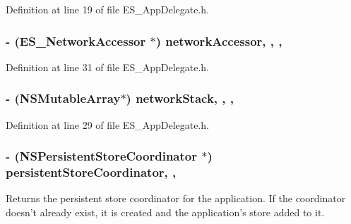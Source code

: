 Definition at line 19 of file E\+S\+\_\+\+App\+Delegate.\+h.

\hypertarget{interface_e_s___app_delegate_a94ebf7775cdbcfc9487f6a0b7b52a703}{
\subsubsection[{network\+Accessor}]{\setlength{\rightskip}{0pt plus 5cm}-\/ ({\bf E\+S\+\_\+\+Network\+Accessor} $\ast$) network\+Accessor\hspace{0.3cm}{\ttfamily [read]}, {\ttfamily [write]}, {\ttfamily [nonatomic]}, {\ttfamily [strong]}}}\label{interface_e_s___app_delegate_a94ebf7775cdbcfc9487f6a0b7b52a703}


Definition at line 31 of file E\+S\+\_\+\+App\+Delegate.\+h.

\hypertarget{interface_e_s___app_delegate_a33cbe1cc0439892b89b132bffac51092}{
\subsubsection[{network\+Stack}]{\setlength{\rightskip}{0pt plus 5cm}-\/ (N\+S\+Mutable\+Array$\ast$) network\+Stack\hspace{0.3cm}{\ttfamily [read]}, {\ttfamily [write]}, {\ttfamily [atomic]}, {\ttfamily [strong]}}}\label{interface_e_s___app_delegate_a33cbe1cc0439892b89b132bffac51092}


Definition at line 29 of file E\+S\+\_\+\+App\+Delegate.\+h.

\hypertarget{interface_e_s___app_delegate_ae1b7c395b0d5fe3b653696955ea3a7f2}{
\subsubsection[{persistent\+Store\+Coordinator}]{\setlength{\rightskip}{0pt plus 5cm}-\/ (N\+S\+Persistent\+Store\+Coordinator $\ast$) persistent\+Store\+Coordinator\hspace{0.3cm}{\ttfamily [read]}, {\ttfamily [nonatomic]}, {\ttfamily [retain]}}}\label{interface_e_s___app_delegate_ae1b7c395b0d5fe3b653696955ea3a7f2}
Returns the persistent store coordinator for the application. If the coordinator doesn't already exist, it is created and the application's store added to it. 

